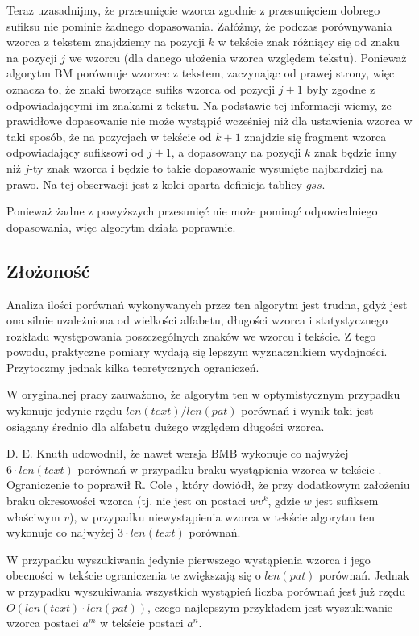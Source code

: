 Teraz uzasadnijmy, że przesunięcie wzorca zgodnie z przesunięciem dobrego sufiksu nie pominie żadnego dopasowania. Załóżmy, że podczas porównywania wzorca z tekstem znajdziemy na pozycji $k$ w tekście znak różniący się od znaku na pozycji $j$ we wzorcu (dla danego ułożenia wzorca względem tekstu). Ponieważ algorytm BM porównuje wzorzec z tekstem, zaczynając od prawej strony, więc oznacza to, że znaki tworzące sufiks wzorca od pozycji $j+1$ były zgodne z odpowiadającymi im znakami z tekstu. Na podstawie tej informacji wiemy, że prawidłowe dopasowanie nie może wystąpić wcześniej niż dla ustawienia wzorca w taki sposób, że na pozycjach w tekście od $k+1$ znajdzie się fragment wzorca odpowiadający sufiksowi od $j+1$, a dopasowany na pozycji $k$ znak będzie inny niż $j$-ty znak wzorca i będzie to takie dopasowanie wysunięte najbardziej na prawo. Na tej obserwacji jest z kolei oparta definicja tablicy $gss$.

Ponieważ żadne z powyższych przesunięć nie może pominąć odpowiedniego dopasowania, więc algorytm działa poprawnie.

\subsection{Złożoność}
Analiza ilości porównań wykonywanych przez ten algorytm jest trudna, gdyż jest ona silnie uzależniona od wielkości alfabetu, długości wzorca i statystycznego rozkładu występowania poszczególnych znaków we wzorcu i tekście. Z tego powodu, praktyczne pomiary wydają się lepszym wyznacznikiem wydajności. Przytoczmy jednak kilka teoretycznych ograniczeń. 

W oryginalnej pracy zauważono, że algorytm ten w optymistycznym przypadku wykonuje jedynie rzędu $len(text)/len(pat)$ porównań i wynik taki jest osiągany średnio dla alfabetu dużego względem długości wzorca.

D. E. Knuth udowodnił, że nawet wersja BMB wykonuje co najwyżej $6 \cdot len(text)$ porównań w przypadku braku wystąpienia wzorca w tekście \cite{KMP}. Ograniczenie to poprawił R. Cole \cite{BM-Cole}, który dowiódł, że przy dodatkowym założeniu braku okresowości wzorca (tj. nie jest on postaci $wv^{k}$, gdzie $w$ jest sufiksem właściwym $v$), w przypadku niewystąpienia wzorca w tekście algorytm ten wykonuje co najwyżej $3 \cdot len(text)$ porównań.

W przypadku wyszukiwania jedynie pierwszego wystąpienia wzorca i jego obecności w tekście ograniczenia te zwiększają się o $len(pat)$ porównań. Jednak w przypadku wyszukiwania wszystkich wystąpień liczba porównań jest już rzędu $O(len(text) \cdot len(pat))$, czego najlepszym przykładem jest wyszukiwanie wzorca postaci $a^{m}$ w tekście postaci $a^{n}$. 


